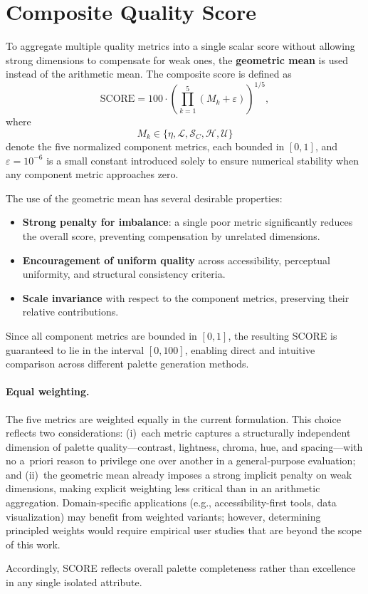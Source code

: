 \section{Composite Quality Score}

To aggregate multiple quality metrics into a single scalar score without
allowing strong dimensions to compensate for weak ones, the
\textbf{geometric mean} is used instead of the arithmetic mean.
The composite score is defined as
\begin{equation}
\mathrm{SCORE}
=
100 \cdot
\left(
\prod_{k=1}^{5} (M_k + \varepsilon)
\right)^{1/5},
\end{equation}
where
\[
M_k \in \{\eta, \mathcal{L}, \mathcal{S}_C, \mathcal{H}, \mathcal{U}\}
\]
denote the five normalized component metrics, each bounded in $[0,1]$, and
$\varepsilon = 10^{-6}$ is a small constant introduced solely to ensure
numerical stability when any component metric approaches zero.

The use of the geometric mean has several desirable properties:
\begin{itemize}
\item \textbf{Strong penalty for imbalance}: a single poor metric significantly
reduces the overall score, preventing compensation by unrelated dimensions.
\item \textbf{Encouragement of uniform quality} across accessibility,
perceptual uniformity, and structural consistency criteria.
\item \textbf{Scale invariance} with respect to the component metrics,
preserving their relative contributions.
\end{itemize}

Since all component metrics are bounded in $[0,1]$, the resulting SCORE is
guaranteed to lie in the interval $[0,100]$, enabling direct and intuitive
comparison across different palette generation methods.

\paragraph{Equal weighting.}
The five metrics are weighted equally in the current formulation.
This choice reflects two considerations:
(i)~each metric captures a structurally independent dimension of palette
quality---contrast, lightness, chroma, hue, and spacing---with no a~priori
reason to privilege one over another in a general-purpose evaluation; and
(ii)~the geometric mean already imposes a strong implicit penalty on weak
dimensions, making explicit weighting less critical than in an arithmetic
aggregation.
Domain-specific applications (e.g., accessibility-first tools, data
visualization) may benefit from weighted variants; however, determining
principled weights would require empirical user studies that are beyond
the scope of this work.

Accordingly, SCORE reflects overall palette completeness rather than excellence
in any single isolated attribute.
